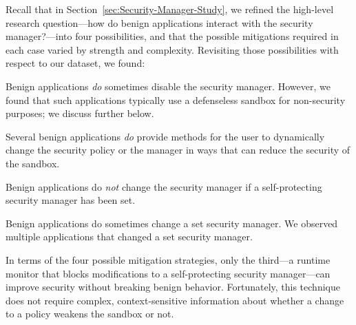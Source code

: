 \documentclass{sig-alternate}
\begin{document}
Recall that in Section~\ref{sec:Security-Manager-Study}, we refined the
high-level research question---how do benign applications interact with the
security manager?---into four possibilities, and that the possible mitigations
required in each case varied by strength and complexity.  Revisiting those
possibilities with respect to our dataset, we found:
\begin{flushenum}\setlength{\parskip}{0pt}
  \setlength{\parsep}{0pt}
  \setlength{\itemsep}{0pt}
\item Benign applications \emph{do} sometimes disable the security manager.
  However, we found that such applications typically use a defenseless sandbox for
  non-security purposes; we discuss further below.

\item Several benign applications \emph{do} provide methods for the user to
  dynamically change the security policy or the manager in ways that can reduce
  the security of the sandbox.

\item Benign applications do \emph{not} change the
security manager if a self-protecting security manager has been set.  

\item Benign applications do sometimes change a set security manager.  We
  observed multiple applications that changed a set security manager.
\end{flushenum}

In terms of the four possible mitigation strategies,
only the third---a runtime monitor that blocks modifications to a self-protecting security manager---can
improve security without breaking benign behavior. 
Fortunately, this technique does not require complex, context-sensitive
information about whether a change to a policy weakens the sandbox or not. 
\end{document}

